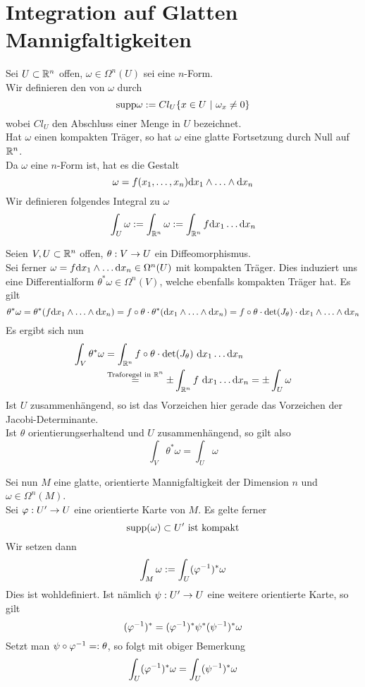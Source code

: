 \section{Integration auf Glatten Mannigfaltigkeiten}

\Def{}
Sei $U \subset \mathbb{R}^n$ offen, $\omega \in \Omega^n(U)$ sei eine $n$-Form.\\
Wir definieren den  von $\omega$ durch
\[ \supp \omega := Cl_U{\set{x \in U}{\omega_x \neq 0}} \]
wobei $Cl_U$ den Abschluss einer Menge in $U$ bezeichnet.\\
Hat $\omega$ einen kompakten Träger, so hat $\omega$ eine glatte Fortsetzung durch Null auf $\mathbb{R}^n$.\\
Da $\omega$ eine $n$-Form ist, hat es die Gestalt
\[ \omega = f(x_1, \ldots, x_n) \text{d} x_1 \wedge \ldots \wedge \text{d} x_n \]
Wir definieren folgendes Integral zu $\omega$
\[ \int_U \omega := \int_{\mathbb{R}^n}\omega := \int_{\mathbb{R}^n} f \text{d} x_1 \ldots \text{d} x_n \]

\Bem{}
Seien $V,U \subset \mathbb{R}^n$ offen, $\theta : V \overset{}{\rightarrow} U$ ein Diffeomorphismus.\\
Sei ferner $\omega = f \text{d} x_1 \wedge \ldots \text{d} x_n\in \Omega^n(U)$ mit kompakten Träger. Dies induziert uns eine Differentialform $\theta^*\omega \in \Omega^n(V)$, welche ebenfalls kompakten Träger hat. Es gilt
\[ \theta^*\omega= \theta^*(f\text{d} x_1 \wedge \ldots \wedge \text{d} x_n) = f\circ \theta \cdot \theta^*(\text{d} x_1 \wedge \ldots \wedge \text{d} x_n) = f\circ \theta \cdot \det(J_\theta) \cdot \text{d} x_1 \wedge \ldots \wedge \text{d} x_n \]
Es ergibt sich nun
\begin{align*}
\int_V \theta^*\omega &= \int_{\mathbb{R}^n} f\circ \theta \cdot \det(J_\theta)~ \text{d} x_1 \ldots \text{d} x_n\\
&\overset{\text{Traforegel in }\mathbb{R}^n}{=} \pm \int_{\mathbb{R}^n} f~ \text{d} x_1 \ldots \text{d} x_n = \pm \int_U \omega
\end{align*}
Ist $U$ zusammenhängend, so ist das Vorzeichen hier gerade das Vorzeichen der Jacobi-Determinante.\\
Ist $\theta$ orientierungserhaltend und $U$ zusammenhängend, so gilt also
\[ \int_V \theta^*\omega = \int_U \omega \]

\Def{}
Sei nun $M$ eine glatte, orientierte Mannigfaltigkeit der Dimension $n$ und $\omega \in \Omega^n(M)$.\\
Sei $\varphi : U' \overset{}{\rightarrow} U$ eine orientierte Karte von $M$. Es gelte ferner
\[ \text{supp}(\omega) \subset U' \text{ ist kompakt} \]
Wir setzen dann
\[ \int_M  \omega := \int_U (\varphi^{-1})^*\omega \]
Dies ist wohldefiniert. Ist nämlich $\psi : U' \overset{}{\rightarrow} U$ eine weitere orientierte Karte, so gilt
\[ (\varphi^{-1})^* = (\varphi^{-1})^*\psi^* (\psi^{-1})^* \omega \]
Setzt man $\psi \circ \varphi^{-1} =: \theta$, so folgt mit obiger Bemerkung
\[ \int_U (\varphi^{-1})^*\omega = \int_U (\psi^{-1})^*\omega \]


